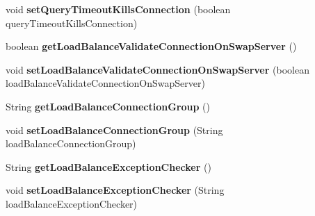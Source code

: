 \begin{DoxyCompactItemize}
\item 
\mbox{\label{classcom_1_1mysql_1_1jdbc_1_1_connection_properties_impl_a591eacc2e17b42c528822f36dba9c124}} 
void {\bfseries set\+Query\+Timeout\+Kills\+Connection} (boolean query\+Timeout\+Kills\+Connection)
\item 
\mbox{\label{classcom_1_1mysql_1_1jdbc_1_1_connection_properties_impl_a63453e8a3d069b12e72cd6c6c9b17126}} 
boolean {\bfseries get\+Load\+Balance\+Validate\+Connection\+On\+Swap\+Server} ()
\item 
\mbox{\label{classcom_1_1mysql_1_1jdbc_1_1_connection_properties_impl_a7bb3f1034c5f0e4a9bf866499104e6cd}} 
void {\bfseries set\+Load\+Balance\+Validate\+Connection\+On\+Swap\+Server} (boolean load\+Balance\+Validate\+Connection\+On\+Swap\+Server)
\item 
\mbox{\label{classcom_1_1mysql_1_1jdbc_1_1_connection_properties_impl_a367a7f5e49c332934c51e9339584eb40}} 
String {\bfseries get\+Load\+Balance\+Connection\+Group} ()
\item 
\mbox{\label{classcom_1_1mysql_1_1jdbc_1_1_connection_properties_impl_a0362c5df842a13f8f76b53db8be0a7fc}} 
void {\bfseries set\+Load\+Balance\+Connection\+Group} (String load\+Balance\+Connection\+Group)
\item 
\mbox{\label{classcom_1_1mysql_1_1jdbc_1_1_connection_properties_impl_afd7ab8de6448d248f0853808c4ad0c31}} 
String {\bfseries get\+Load\+Balance\+Exception\+Checker} ()
\item 
\mbox{\label{classcom_1_1mysql_1_1jdbc_1_1_connection_properties_impl_afa33de9820ba54a1329f926ec270cf85}} 
void {\bfseries set\+Load\+Balance\+Exception\+Checker} (String load\+Balance\+Exception\+Checker)
\item 
\mbox{\label{classcom_1_1mysql_1_1jdbc_1_1_connection_properties_impl_a1ec44328448f6dc5d859d5a3489ab7ab}} 

\end{DoxyCompactItemize}
